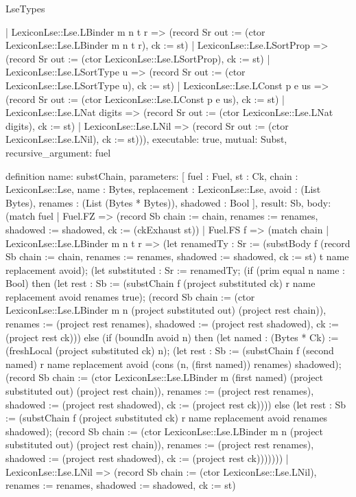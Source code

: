 \begin{lexlean}{LseTypes}
\begin{semanticmodule}
{      | LexiconLse::Lse.LBinder m n t r => (record Sr {out := (ctor LexiconLse::Lse.LBinder m n t r), ck := st})
      | LexiconLse::Lse.LSortProp => (record Sr {out := (ctor LexiconLse::Lse.LSortProp), ck := st})
      | LexiconLse::Lse.LSortType u => (record Sr {out := (ctor LexiconLse::Lse.LSortType u), ck := st})
      | LexiconLse::Lse.LConst p e us => (record Sr {out := (ctor LexiconLse::Lse.LConst p e us), ck := st})
      | LexiconLse::Lse.LNat digits => (record Sr {out := (ctor LexiconLse::Lse.LNat digits), ck := st})
      | LexiconLse::Lse.LNil => (record Sr {out := (ctor LexiconLse::Lse.LNil), ck := st}))),
  executable: true,
  mutual: Subst,
  recursive_argument: fuel
}

definition{
  name: substChain,
  parameters: [
    fuel : Fuel,
    st : Ck,
    chain : LexiconLse::Lse,
    name : Bytes,
    replacement : LexiconLse::Lse,
    avoid : (List Bytes),
    renames : (List (Bytes * Bytes)),
    shadowed : Bool
  ],
  result: Sb,
  body: (match fuel
    | Fuel.FZ => (record Sb {chain := chain, renames := renames, shadowed := shadowed, ck := (ckExhaust st)})
    | Fuel.FS f => (match chain
      | LexiconLse::Lse.LBinder m n t r => (let renamedTy : Sr := (substBody f (record Sb {chain := chain, renames := renames, shadowed := shadowed, ck := st}) t name replacement avoid); (let substituted : Sr := renamedTy; (if (prim equal n name : Bool) then (let rest : Sb := (substChain f (project substituted ck) r name replacement avoid renames true); (record Sb {chain := (ctor LexiconLse::Lse.LBinder m n (project substituted out) (project rest chain)), renames := (project rest renames), shadowed := (project rest shadowed), ck := (project rest ck)})) else (if (boundIn avoid n) then (let named : (Bytes * Ck) := (freshLocal (project substituted ck) n); (let rest : Sb := (substChain f (second named) r name replacement avoid (cons (n, (first named)) renames) shadowed); (record Sb {chain := (ctor LexiconLse::Lse.LBinder m (first named) (project substituted out) (project rest chain)), renames := (project rest renames), shadowed := (project rest shadowed), ck := (project rest ck)}))) else (let rest : Sb := (substChain f (project substituted ck) r name replacement avoid renames shadowed); (record Sb {chain := (ctor LexiconLse::Lse.LBinder m n (project substituted out) (project rest chain)), renames := (project rest renames), shadowed := (project rest shadowed), ck := (project rest ck)}))))))
      | LexiconLse::Lse.LNil => (record Sb {chain := (ctor LexiconLse::Lse.LNil), renames := renames, shadowed := shadowed, ck := st})
}
\end{semanticmodule}
\end{lexlean}
